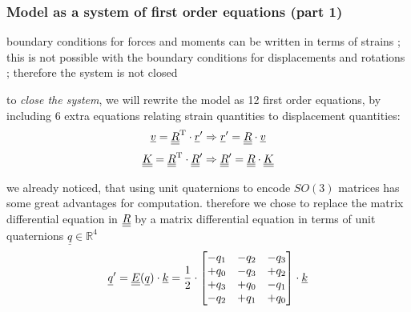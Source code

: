 \begin{frame}
  \frametitle{Model as a system of first order equations (part 1)}
  
  boundary conditions for forces and moments can be written in terms of strains ; this is not possible with the boundary conditions for displacements and rotations ; therefore the system is not closed
  
  \vspace{0.7em}
  to \textit{close the system}, we will rewrite the model as 12 first order equations, \newline
  by including 6 extra equations relating strain quantities to displacement quantities:
  \begin{displaymath}
    \underline{v} = \underline{\underline{R}}^{\mathrm{T}} \cdot \underline{r}^{\prime}
    \Rightarrow
    \underline{r}^{\prime} = \underline{\underline{R}} \cdot \underline{v}
  \end{displaymath}
  \begin{displaymath}
    \underline{\underline{K}} = \underline{\underline{R}}^{\mathrm{T}} \cdot \underline{\underline{R}}^{\prime}
    \Rightarrow
    \underline{\underline{R}}^{\prime} = \underline{\underline{R}} \cdot \underline{\underline{K}}
  \end{displaymath}
  
  \vspace{0.7em}
  we already noticed, that using unit quaternions to encode $SO(3)$ matrices has some great advantages for computation. therefore we chose to replace the matrix differential equation in $\underline{\underline{R}}$ by a matrix differential equation in terms of unit quaternions $\underline{q} \in \mathbb{R}^4$
  \begin{displaymath}
    \underline{q}^{\prime} = \underline{\underline{E}}(\underline{q}) \cdot \underline{k} =
    \frac{1}{2} \cdot \begin{bmatrix}
      -q_1 & -q_2 & -q_3 \\
      +q_0 & -q_3 & +q_2 \\
      +q_3 & +q_0 & -q_1 \\
      -q_2 & +q_1 & +q_0
    \end{bmatrix} \cdot \underline{k}
  \end{displaymath}
\end{frame}

